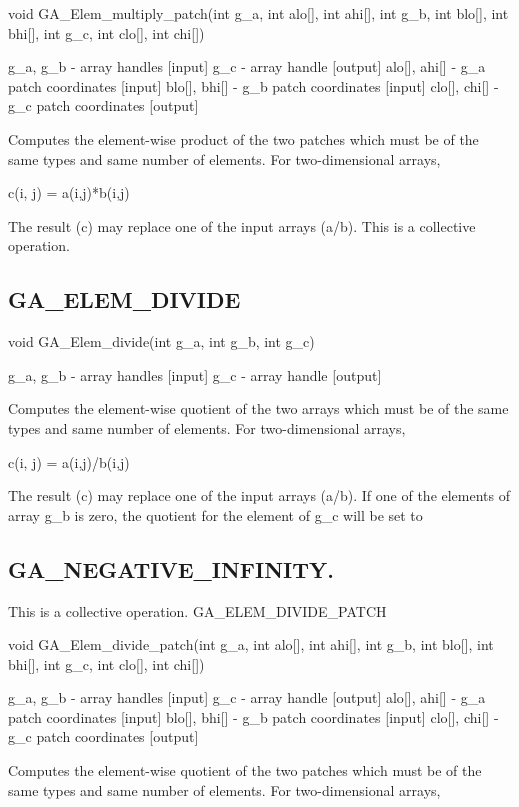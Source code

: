 void GA\_Elem\_multiply\_patch(int g\_a, int alo{[}{]}, int ahi{[}{]},
int g\_b, int blo{[}{]}, int bhi{[}{]}, int g\_c, int clo{[}{]}, int
chi{[}{]})

g\_a, g\_b - array handles {[}input{]} g\_c - array handle {[}output{]}
alo{[}{]}, ahi{[}{]} - g\_a patch coordinates {[}input{]} blo{[}{]},
bhi{[}{]} - g\_b patch coordinates {[}input{]} clo{[}{]}, chi{[}{]}
- g\_c patch coordinates {[}output{]}

Computes the element-wise product of the two patches which must be
of the same types and same number of elements. For two-dimensional
arrays,

c(i, j) = a(i,j){*}b(i,j)

The result (c) may replace one of the input arrays (a/b). This is
a collective operation. 


\subsection*{GA\_ELEM\_DIVIDE}

void GA\_Elem\_divide(int g\_a, int g\_b, int g\_c)

g\_a, g\_b - array handles {[}input{]} g\_c - array handle {[}output{]}

Computes the element-wise quotient of the two arrays which must be
of the same types and same number of elements. For two-dimensional
arrays,

c(i, j) = a(i,j)/b(i,j)

The result (c) may replace one of the input arrays (a/b). If one of
the elements of array g\_b is zero, the quotient for the element of
g\_c will be set to


\subsection*{GA\_NEGATIVE\_INFINITY.}

This is a collective operation. GA\_ELEM\_DIVIDE\_PATCH

void GA\_Elem\_divide\_patch(int g\_a, int alo{[}{]}, int ahi{[}{]},
int g\_b, int blo{[}{]}, int bhi{[}{]}, int g\_c, int clo{[}{]}, int
chi{[}{]})

g\_a, g\_b - array handles {[}input{]} g\_c - array handle {[}output{]}
alo{[}{]}, ahi{[}{]} - g\_a patch coordinates {[}input{]} blo{[}{]},
bhi{[}{]} - g\_b patch coordinates {[}input{]} clo{[}{]}, chi{[}{]}
- g\_c patch coordinates {[}output{]}

Computes the element-wise quotient of the two patches which must be
of the same types and same number of elements. For two-dimensional
arrays,

